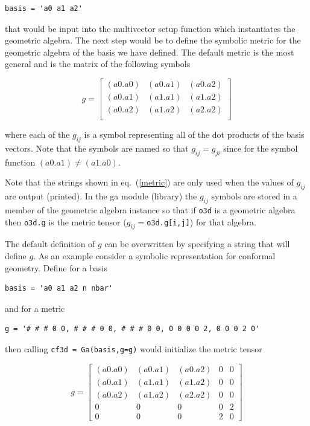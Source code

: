 \documentclass[12pt]{report}
\newcommand{\lbrk}{\left [}
\newcommand{\rbrk}{\right ]}
\newcommand{\T}[1]{\texttt{#1}}
\begin{document}
\begin{lstlisting}[numbers=none]
  basis = 'a0 a1 a2'
\end{lstlisting}  

that would be input into the multivector setup function which instantiates the geometric
algebra.  The next step would be
to define the symbolic metric for the geometric algebra of the basis we
have defined. The default metric is the most general and is the matrix of
the following symbols

  \begin{equation}\label{metric}
  g = \lbrk
  \begin{array}{ccc}
    (a0.a0)   & (a0.a1)  & (a0.a2) \\
    (a0.a1) & (a1.a1)  & (a1.a2) \\
    (a0.a2) & (a1.a2) & (a2.a2) \\
  \end{array}
  \rbrk
  \end{equation}


where each of the $g_{ij}$ is a symbol representing all of the dot
products of the basis vectors. Note that the symbols are named so that
$g_{ij} = g_{ji}$ since for the symbol function
$(a0.a1) \ne (a1.a0)$.

Note that the strings shown in eq.~(\ref{metric}) are only used when the values
of $g_{ij}$ are output (printed).   In the ga module (library)
the $g_{ij}$ symbols are stored in a member of the geometric algebra
instance so that if  \T{o3d} is a geometric algebra then \T{o3d.g} is 
the metric tensor ($g_{ij} = $\T{o3d.g[i,j]}) for that algebra.

The default definition of $g$ can be overwritten by specifying a string
that will define $g$. As an example consider a symbolic representation
for conformal geometry. Define for a basis

\begin{lstlisting}[numbers=none]
  basis = 'a0 a1 a2 n nbar'
\end{lstlisting}

and for a metric

\begin{lstlisting}[numbers=none]
  g = '# # # 0 0, # # # 0 0, # # # 0 0, 0 0 0 0 2, 0 0 0 2 0'
\end{lstlisting}

then calling \T{cf3d = Ga(basis,g=g)} would initialize the metric tensor

  \begin{equation}
  g = \lbrk
  \begin{array}{ccccc}
    (a0.a0) & (a0.a1)  & (a0.a2) & 0 & 0\\
    (a0.a1) & (a1.a1)  & (a1.a2) & 0 & 0\\
    (a0.a2) & (a1.a2)  & (a2.a2) & 0 & 0 \\
    0 & 0 & 0 & 0 & 2 \\
    0 & 0 & 0 & 2 & 0
  \end{array}
  \rbrk
  \end{equation}
\end{document}
